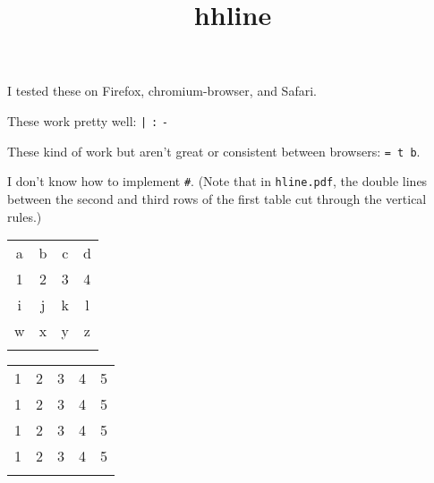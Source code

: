 \documentclass{amsart}
\title{hhline}
\begin{document}
\maketitle

I tested these on Firefox, chromium-browser, and Safari.

These work pretty well: \texttt{\string|} \texttt{:} \texttt{-}
\texttt{\string~}

These kind of work but aren't great or consistent between browsers:
\texttt{= t b}.

I don't know how to implement \texttt{\#}. (Note that in
\texttt{hline.pdf}, the double lines between the second and third rows
of the first table cut through the vertical rules.)

\begin{table}[h]
\begin{tabular}{||cc||c|c||}
\hhline{|t:==:t:==:t|}
a&b&c&d\\
\hhline{|:==:|~|~||}
1&2&3&4\\
\hhline{#==#~|=#}
i&j&k&l\\
\hhline{||--||--||}
w&x&y&z\\
\hhline{|b:==:b:==:b|}
\end{tabular}
\end{table}

\bigskip

\begin{table}[h]
\begin{tabular}{|c|c|c|c|c|}
\hhline{|-|~|~|~|~|}
1 & 2 & 3  & 4  & 5\\ \hhline{|~|-|~|~|~|}
1 & 2 & 3  & 4  & 5\\ \hhline{|~|~|-|~|~|}
1 & 2 & 3  & 4  & 5\\ \hhline{*{3}{|~}|=|~|}
1 & 2 & 3  & 4  & 5\\ \hhline{|~|~|~|~|-|}
\end{tabular}

\end{table}
\end{document}
